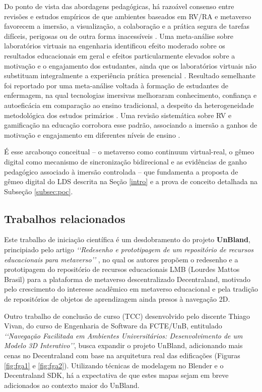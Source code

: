 \documentclass[12pt]{article}
\begin{document}
Do ponto de vista das abordagens pedagógicas, há razoável consenso entre revisões e estudos empíricos de que ambientes baseados em RV/RA e metaverso favorecem a imersão, a visualização, a colaboração e a prática segura de tarefas difíceis, perigosas ou de outra forma inacessíveis \cite{Kye2021Educational} \cite{Camilleri2023Metaverse}. Uma meta-análise sobre laboratórios virtuais na engenharia identificou efeito moderado sobre os resultados educacionais em geral e efeitos particularmente elevados sobre a motivação e o engajamento dos estudantes, ainda que os laboratórios virtuais não substituam integralmente a experiência prática presencial \cite{Li2024Effectiveness}. Resultado semelhante foi reportado por uma meta-análise voltada à formação de estudantes de enfermagem, na qual tecnologias imersivas melhoraram conhecimento, confiança e autoeficácia em comparação ao ensino tradicional, a despeito da heterogeneidade metodológica dos estudos primários \cite{Park2024Effects}. Uma revisão sistemática sobre RV e gamificação na educação corrobora esse padrão, associando a imersão a ganhos de motivação e engajamento em diferentes níveis de ensino \cite{Lampropoulos2024Virtual}.

É esse arcabouço conceitual -- o metaverso como continuum virtual-real, o gêmeo digital como mecanismo de sincronização bidirecional e as evidências de ganho pedagógico associado à imersão controlada -- que fundamenta a proposta de gêmeo digital do LDS descrita na Seção \ref{intro} e a prova de conceito detalhada na Subseção \ref{subsec:poc}.

\subsection{Trabalhos relacionados}

Este trabalho de iniciação científica é um desdobramento do projeto \textbf{UnBland}, principiado pelo artigo \textit{\lq\lq Redesenho e prototipagem de um repositório de recursos educacionais para metaverso\rq\rq} \cite{artigo_unbland}, no qual os autores propõem o redesenho e a prototipagem do repositório de recursos educacionais LMB (Lourdes Mattos Brasil) para a plataforma de metaverso descentralizado Decentraland, motivado pelo crescimento do interesse acadêmico em metaverso educacional e pela tradição de repositórios de objetos de aprendizagem ainda presos à navegação 2D.

Outro trabalho de conclusão de curso (TCC) desenvolvido pelo discente Thiago Vivan, do curso de Engenharia de Software da FCTE/UnB, entitulado \textit{\lq\lq Navegação Facilitada em Ambientes Universitários: Desenvolvimento de um Modelo 3D Interativo\rq\rq}, busca expandir o projeto UnBland, adicionando mais cenas no Decentraland com base na arquitetura real das edificações (Figuras \ref{fig:fga1} e \ref{fig:fga2}). Utilizando técnicas de modelagem no Blender e o Decentraland SDK, há a expectativa de que estes mapas sejam em breve adicionados ao contexto maior do UnBland.
\end{document}
